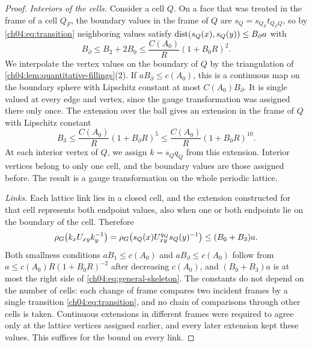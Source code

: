 \begin{proof}
\emph{Interiors of the cells.} Consider a cell $Q$. On a face that was treated in the frame of a cell $Q_F$, the boundary values in the frame of $Q$ are $s_Q=s_{Q_F}t_{Q_FQ}$, so by \eqref{ch04:eq:transition} neighboring values satisfy $\operatorname{dist}(s_Q(x),s_Q(y))\le B_\partial a$ with
\[
 B_\partial\le B_2+2B_0\le\frac{C(A_0)}R(1+B_0R)^2.
\]
We interpolate the vertex values on the boundary of $Q$ by the triangulation of \cref{ch04:lem:quantitative-fillings}(2). If $aB_\partial\le c(A_0)$, this is a continuous map on the boundary sphere with Lipschitz constant at most $C(A_0)B_\partial$. It is single valued at every edge and vertex, since the gauge transformation was assigned there only once. The extension over the ball gives an extension in the frame of $Q$ with Lipschitz constant
\[
 B_3\le\frac{C(A_0)}R(1+B_\partial R)^5\le\frac{C(A_0)}R(1+B_0R)^{10}.
\]
At each interior vertex of $Q$, we assign $k=s_Qq_Q$ from this extension. Interior vertices belong to only one cell, and the boundary values are those assigned before. The result is a gauge transformation on the whole periodic lattice.

\emph{Links.} Each lattice link lies in a closed cell, and the extension constructed for that cell represents both endpoint values, also when one or both endpoints lie on the boundary of the cell. Therefore
\[
 \rho_G\bigl(k_xU_{xy}k_y^{-1}\bigr)=\rho_G\bigl(s_Q(x)U^{q_Q}_{xy}s_Q(y)^{-1}\bigr)\le(B_0+B_3)a.
\]
Both smallness conditions $aB_1\le c(A_0)$ and $aB_\partial\le c(A_0)$ follow from $a\le c(A_0)R(1+B_0R)^{-2}$ after decreasing $c(A_0)$, and $(B_0+B_3)a$ is at most the right side of \eqref{ch04:eq:general-skeleton}. The constants do not depend on the number of cells: each change of frame compares two incident frames by a single transition \eqref{ch04:eq:transition}, and no chain of comparisons through other cells is taken. Continuous extensions in different frames were required to agree only at the lattice vertices assigned earlier, and every later extension kept these values. This suffices for the bound on every link.
\end{proof}

